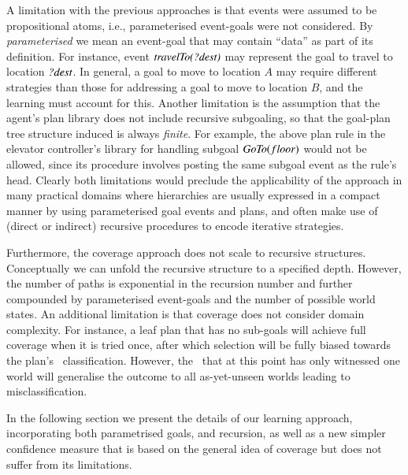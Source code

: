 A limitation with the previous approaches is that events were assumed to be
propositional atoms, i.e., parameterised event-goals were not considered. By
\emph{parameterised} we mean an event-goal that may contain ``data'' as part of
its definition. For instance, event ${\mbox{\textit{travelTo(?dest)}}}$ may represent
the goal to travel to location ${\mbox{\textit{?dest}}}$. In general, a goal to move to
location $A$ may require different strategies than those for addressing a goal to
move to location $B$, and the learning must account for this.
Another limitation is the assumption that the agent's plan library does not
include recursive subgoaling, so that the goal-plan tree structure induced is
always \emph{finite}.
For example, the above plan rule in the elevator controller's library for
handling subgoal ${\mbox{\textit{GoTo}}}(floor)$ would not be allowed, since its procedure
involves posting the same subgoal event as the rule's head.
Clearly both limitations would preclude the applicability of the approach in many
practical domains where hierarchies are usually expressed in a compact manner by
using parameterised goal events and plans, and often make use of (direct or
indirect) recursive procedures to encode iterative strategies.



Furthermore, the coverage approach \cite{Singh:AAMAS10} does not scale
to recursive structures. 
Conceptually we can unfold the recursive structure to a
specified depth. However, the number of paths is exponential in the
recursion number and further compounded by parameterised event-goals
and the number of possible world states.
%
An additional limitation is that coverage does not consider domain
complexity. For instance, a leaf plan that has no sub-goals will
achieve full coverage when it is tried once, after which selection
will be fully biased towards the plan's \dt\ classification. However,
the \dt\ that at this point has only witnessed one world will
generalise the outcome to all as-yet-unseen worlds leading to
misclassification. 

In the following section we present the details of our learning
approach, incorporating both parametrised goals, and recursion, as
well as a new simpler confidence measure that is based on the 
general idea of coverage but does not suffer from its limitations.








